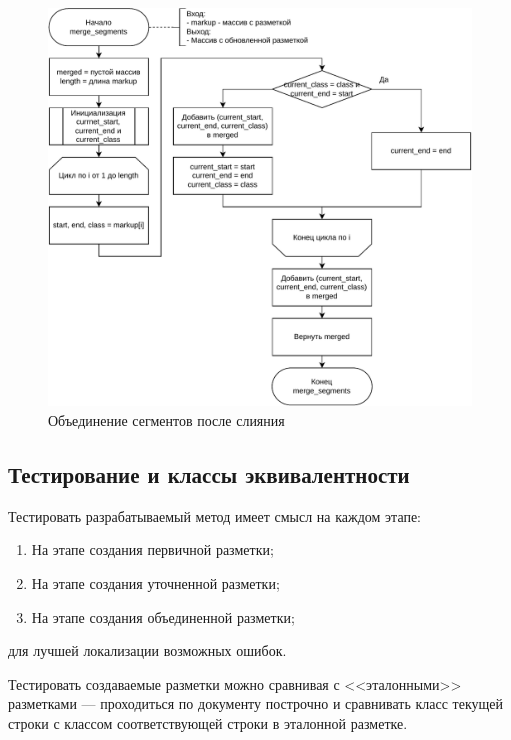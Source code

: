 \begin{figure}[H]
	\centering
	\includegraphics[width=\textwidth]{diag/merge.segments.pdf}
	\caption{Объединение сегментов после слияния}
	\label{fig:merge-segments}
\end{figure}




\subsection{Тестирование и классы эквивалентности}

Тестировать разрабатываемый метод имеет смысл на каждом этапе:
\begin{enumerate}
    \item На этапе создания первичной разметки;
    \item На этапе создания уточненной разметки;
    \item На этапе создания объединенной разметки;
\end{enumerate}
для лучшей локализации возможных ошибок.

Тестировать создаваемые разметки можно сравнивая с <<эталонными>> разметками --- проходиться по документу построчно и сравнивать класс текущей строки с классом соответствующей строки в эталонной разметке.

